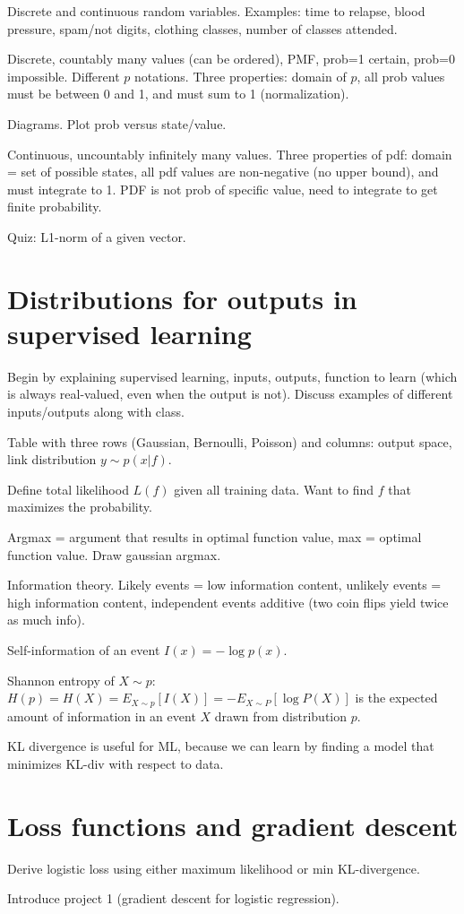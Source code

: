 \documentclass{article}
\begin{document}
Discrete and continuous random variables. Examples: time to relapse,
blood pressure, spam/not digits, clothing classes, number of classes
attended.

Discrete, countably many values (can be ordered), PMF, prob=1 certain,
prob=0 impossible. Different $p$ notations. Three properties: domain
of $p$, all prob values must be between 0 and 1, and must sum to 1
(normalization).

Diagrams. Plot prob versus state/value.

Continuous, uncountably infinitely many values. Three properties of pdf:
domain = set of possible states, all pdf values are non-negative (no
upper bound), and must integrate to 1. PDF is not prob of specific
value, need to integrate to get finite probability.

Quiz: L1-norm of a given vector.

\section{Distributions for outputs in supervised learning}

Begin by explaining supervised learning, inputs, outputs, function to
learn (which is always real-valued, even when the output is
not). Discuss examples of different inputs/outputs along with class.

Table with three rows (Gaussian, Bernoulli, Poisson) and columns:
output space, link distribution $y\sim p(x|f)$.

Define total likelihood $L(f)$ given all training data. Want to find
$f$ that maximizes the probability.

Argmax = argument that results in optimal function value, max =
optimal function value. Draw gaussian argmax.

Information theory. Likely events = low information content, unlikely
events = high information content, independent events additive (two
coin flips yield twice as much info).

Self-information of an event $I(x) = -\log p(x)$.

Shannon entropy of $X\sim p$: $H(p)=H(X)= E_{X\sim p}[I(X)] =
-E_{X\sim P} [ \log P(X) ]$ is the expected amount of information in
an event $X$ drawn from distribution $p$.

KL divergence is useful for ML, because we can learn by finding a
model that minimizes KL-div with respect to data.

\section{Loss functions and gradient descent}

Derive logistic loss using either maximum likelihood or min
KL-divergence.

Introduce project 1 (gradient descent for logistic regression).
\end{document}
